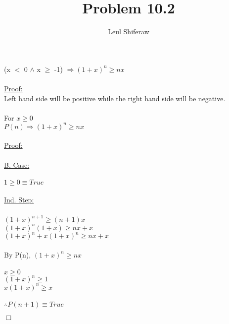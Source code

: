 \documentclass{article}
\title{Problem 10.2}
\author{Leul Shiferaw}
\begin{document}
	\maketitle	
	\newpage
	
	\noindent (x $<$ 0 $\wedge$ x $\geq$ -1) $\Rightarrow (1+x)^n \geq nx$
	\\\\\underline{Proof:}
	\\Left hand side will be positive while the right hand side will be negative.
	\\\\For $x \geq 0$
	\\$P(n) \Rightarrow (1+x)^n \geq nx$
	\\\\\underline{Proof:} 
	\\\\\underline{B. Case:} 
	\\\\$1 \geq 0 \equiv True$
	\\\\\underline{Ind. Step:}
	\\\\$(1+x)^{n+1} \geq (n+1)x$
	\\$(1+x)^n(1+x) \geq nx + x$
	\\$(1+x)^n + x(1+x)^n \geq nx + x$
	\\\\By P(n), $(1+x)^n \geq nx$
	\\\\$x \geq 0$
	\\$(1+x)^n \geq 1$
	\\$x(1+x)^n \geq x$
	\\\\$\therefore P(n+1) \equiv True$
	\begin{flushright}
		$\Box$
	\end{flushright}
\end{document}
